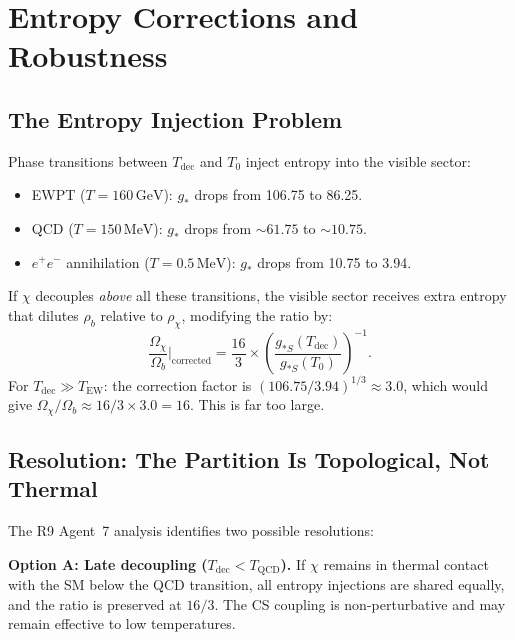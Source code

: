 \documentclass[11pt]{article}
\theoremstyle{definition}
\theoremstyle{remark}
\newcommand{\GeV}{\,\mathrm{GeV}}
\begin{document}
\section{Entropy Corrections and Robustness}
\label{sec:entropy}

\subsection{The Entropy Injection Problem}

Phase transitions between $T_\mathrm{dec}$ and $T_0$ inject entropy into
the visible sector:
\begin{itemize}
  \item EWPT ($T = 160\GeV$): $g_*$ drops from 106.75 to 86.25.
  \item QCD ($T = 150\,\mathrm{MeV}$): $g_*$ drops from $\sim 61.75$ to $\sim 10.75$.
  \item $e^+e^-$ annihilation ($T = 0.5\,\mathrm{MeV}$): $g_*$ drops from
    10.75 to 3.94.
\end{itemize}

If $\chi$ decouples \emph{above} all these transitions, the visible sector
receives extra entropy that dilutes $\rho_b$ relative to $\rho_\chi$,
modifying the ratio by:
\begin{equation}
  \frac{\Omega_\chi}{\Omega_b}\bigg|_\mathrm{corrected}
  = \frac{16}{3} \times \left(\frac{g_{*S}(T_\mathrm{dec})}{g_{*S}(T_0)}\right)^{-1}.
\end{equation}
For $T_\mathrm{dec} \gg T_\mathrm{EW}$: the correction factor is
$(106.75/3.94)^{1/3} \approx 3.0$, which would give
$\Omega_\chi/\Omega_b \approx 16/3 \times 3.0 = 16$. This is far too large.

\subsection{Resolution: The Partition Is Topological, Not Thermal}

The R9 Agent~7 analysis identifies two possible resolutions:

\textbf{Option A: Late decoupling ($T_\mathrm{dec} < T_\mathrm{QCD}$).}
If $\chi$ remains in thermal contact with the SM below the QCD transition,
all entropy injections are shared equally, and the ratio is preserved at
$16/3$. The CS coupling is non-perturbative and may remain effective to
low temperatures.
\end{document}
